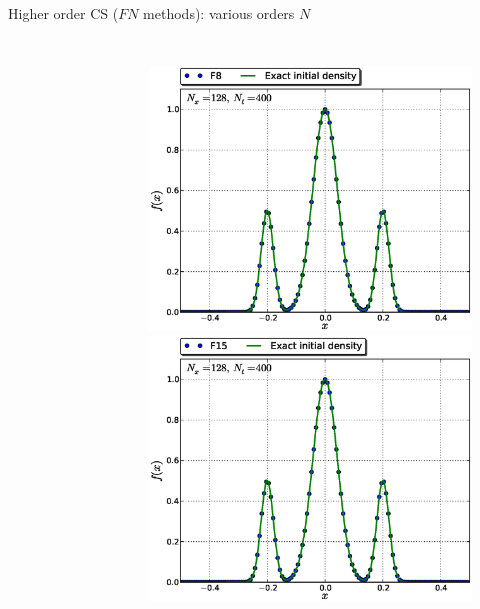 \documentclass{beamer}
\begin{document}
\begin{frame}{Higher order CS ($FN$ methods): various orders $N$}
\begin{columns}
\begin{figure}
\end{figure}
\begin{figure}
\centering
 \includegraphics[width=\textwidth]{graphics/plot_-_GB3_F8__Nx128Nt400_w_f0_itmax}\\ \vspace*{-4mm}
 \includegraphics[width=\textwidth]{graphics/plot_-_GB3_F15__Nx128Nt400_w_f0_itmax}
\end{figure}
 \end{columns}
 
\end{frame}
\end{document}
